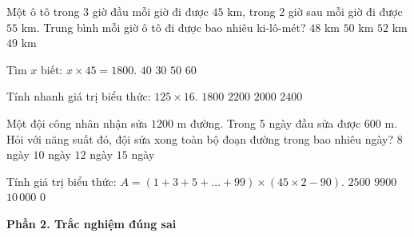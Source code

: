 \begin{ex} %
Một ô tô trong 3 giờ đầu mỗi giờ đi được $45\text{ km}$, trong 2 giờ sau mỗi giờ đi được $55\text{ km}$. Trung bình mỗi giờ ô tô đi được bao nhiêu ki-lô-mét?
\choice
{$48\text{ km}$}
{$50\text{ km}$}
{$52\text{ km}$}
{\True $49\text{ km}$}
\end{ex}

\begin{ex} %
Tìm $x$ biết: $x \times 45 = 1800$.
\choice
{\True $40$}
{$30$}
{$50$}
{$60$}
\end{ex}

\begin{ex} %
Tính nhanh giá trị biểu thức: $125 \times 16$.
\choice
{$1800$}
{$2200$}
{\True $2000$}
{$2400$}
\end{ex}

\begin{ex} %
Một đội công nhân nhận sửa $1200\text{ m}$ đường. Trong 5 ngày đầu sửa được $600\text{ m}$. Hỏi với năng suất đó, đội sửa xong toàn bộ đoạn đường trong bao nhiêu ngày?
\choice
{$8$ ngày}
{\True $10$ ngày}
{$12$ ngày}
{$15$ ngày}
\end{ex}

\begin{ex} %
Tính giá trị biểu thức: $A = (1 + 3 + 5 + \dots + 99) \times (45 \times 2 - 90)$.
\choice
{$2500$}
{$9900$}
{$10\,000$}
{\True $0$}
\end{ex}

\textbf{Phần 2. Trắc nghiệm đúng sai}

